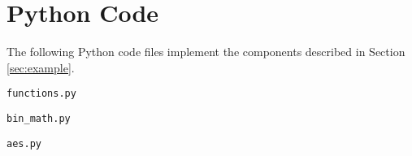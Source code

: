 \section{Python Code}
\label{appendix:code}

The following Python code files implement the components described in Section \ref{sec:example}.

\texttt{functions.py}


\newpage
\texttt{bin\_math.py}


\newpage
\texttt{aes.py}
